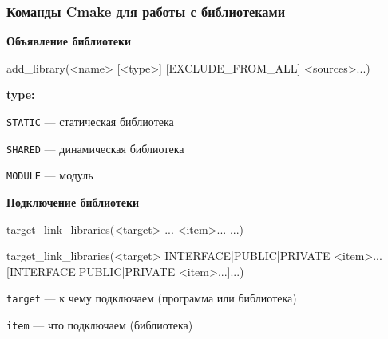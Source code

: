 \documentclass[9pt, aspectratio=1610]{beamer}
\begin{document}
\begin{frame}[fragile]\frametitle{Команды Cmake для работы с библиотеками}
	
	
	\textbf{Объявление библиотеки}
	
	\begin{cmakecode}[linenos = false, fontsize=\normalsize]
		add_library(<name> [<type>] [EXCLUDE_FROM_ALL] <sources>...)
	\end{cmakecode}
	
	\textbf{type:}
	
	\verb|STATIC| --- статическая библиотека 
	
	\verb|SHARED| --- динамическая библиотека
	
	\verb|MODULE| --- модуль
	
	\vspace{2em}
	
	\textbf{Подключение библиотеки}
	
	\begin{cmakecode}[linenos = false, fontsize=\normalsize]
		target_link_libraries(<target> ... <item>... ...)
		
		target_link_libraries(<target>
			{INTERFACE|PUBLIC|PRIVATE} <item>...
			[{INTERFACE|PUBLIC|PRIVATE} <item>...]...)
	\end{cmakecode}
	
	
	\verb|target| --- к чему подключаем (программа или библиотека)
	
	\verb|item| --- что подключаем (библиотека)
	
	
\end{frame}
\end{document}
